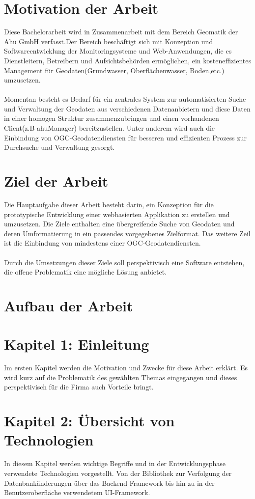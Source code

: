 \documentclass[a4paper,12pt]{scrreprt}
\begin{document}
	\section{Motivation der Arbeit}
	Diese Bachelorarbeit wird in Zusammenarbeit mit dem Bereich Geomatik der Ahu GmbH verfasst.Der Bereich beschäftigt sich mit Konzeption und Softwareentwicklung der Monitoringsysteme und Web-Anwendungen, die es Dienstleitern, Betreibern und Aufsichtsbehörden ermöglichen, ein kosteneffizientes Management für Geodaten(Grundwasser, Oberflächenwasser, Boden,etc.) umzusetzen. \\ \\
	Momentan besteht es Bedarf für ein zentrales System zur automatisierten Suche und Verwaltung der Geodaten aus verschiedenen Datenanbietern und diese Daten in einer homogen Struktur zusammenzubringen und einen vorhandenen Client(z.B ahuManager) bereitzustellen. Unter anderem  wird auch die Einbindung von OGC-Geodatendiensten für besseren und effizienten Prozess zur Durchsuche und Verwaltung gesorgt. 
	
	\section{Ziel der Arbeit}
	Die Hauptaufgabe dieser Arbeit besteht darin, ein Konzeption für die prototypische Entwicklung einer webbasierten Applikation zu erstellen und umzusetzen. Die Ziele enthalten eine übergreifende Suche von Geodaten und deren Umformatierung in ein passendes vorgegebenes Zielformat. Das weitere Zeil ist die Einbindung von mindestens einer OGC-Geodatendiensten.\\ \\ Durch die Umsetzungen dieser Ziele soll perspektivisch eine Software entstehen, die offene Problematik eine mögliche Lösung anbietet.
	
	\section{Aufbau der Arbeit}
	\section*{\small \textbf{Kapitel 1: Einleitung}}
	Im ersten Kapitel werden die Motivation und Zwecke für diese Arbeit erklärt. Es wird kurz auf die Problematik des gewählten Themas eingegangen und dieses perspektivisch für die Firma auch Vorteile bringt.
	
	\section*{\small \textbf{Kapitel 2: Übersicht von Technologien}}
	In diesem Kapitel werden wichtige Begriffe und in der Entwicklungsphase verwendete Technologien vorgestellt. Von der Bibliothek zur Verfolgung der Datenbankänderungen über das Backend-Framework bis hin zu in der Benutzeroberfläche verwendetem UI-Framework.   
\end{document}
